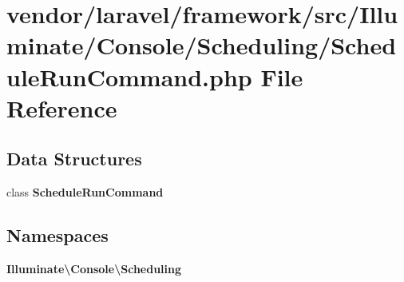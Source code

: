 \section{vendor/laravel/framework/src/\+Illuminate/\+Console/\+Scheduling/\+Schedule\+Run\+Command.php File Reference}
\label{_schedule_run_command_8php}
\subsection*{Data Structures}
\begin{DoxyCompactItemize}
\item 
class {\bf Schedule\+Run\+Command}
\end{DoxyCompactItemize}
\subsection*{Namespaces}
\begin{DoxyCompactItemize}
\item 
 {\bf Illuminate\textbackslash{}\+Console\textbackslash{}\+Scheduling}
\end{DoxyCompactItemize}
